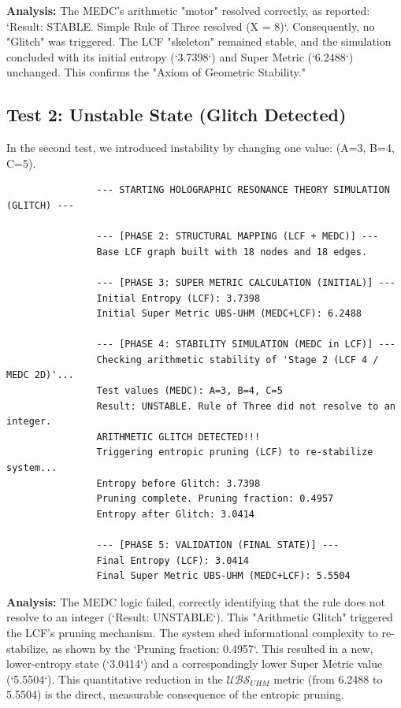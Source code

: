 \documentclass[11pt, a4paper]{article}
\begin{document}
		\textbf{Analysis:} The MEDC's arithmetic "motor" resolved correctly, as reported: `Result: STABLE. Simple Rule of Three resolved (X = 8)`. Consequently, no "Glitch" was triggered. The LCF "skeleton" remained stable, and the simulation concluded with its initial entropy (`3.7398`) and Super Metric (`6.2488`) unchanged. This confirms the "Axiom of Geometric Stability."
		
		\subsection{Test 2: Unstable State (Glitch Detected)}
		In the second test, we introduced instability by changing one value: (A=3, B=4, C=5).
		
		\begin{minipage}{\textwidth}
			\begin{verbatim}
				--- STARTING HOLOGRAPHIC RESONANCE THEORY SIMULATION (GLITCH) ---
				
				--- [PHASE 2: STRUCTURAL MAPPING (LCF + MEDC)] ---
				Base LCF graph built with 18 nodes and 18 edges.
				
				--- [PHASE 3: SUPER METRIC CALCULATION (INITIAL)] ---
				Initial Entropy (LCF): 3.7398
				Initial Super Metric UBS-UHM (MEDC+LCF): 6.2488
				
				--- [PHASE 4: STABILITY SIMULATION (MEDC in LCF)] ---
				Checking arithmetic stability of 'Stage 2 (LCF 4 / MEDC 2D)'...
				Test values (MEDC): A=3, B=4, C=5
				Result: UNSTABLE. Rule of Three did not resolve to an integer.
				ARITHMETIC GLITCH DETECTED!!!
				Triggering entropic pruning (LCF) to re-stabilize system...
				Entropy before Glitch: 3.7398
				Pruning complete. Pruning fraction: 0.4957
				Entropy after Glitch: 3.0414
				
				--- [PHASE 5: VALIDATION (FINAL STATE)] ---
				Final Entropy (LCF): 3.0414
				Final Super Metric UBS-UHM (MEDC+LCF): 5.5504
			\end{verbatim}
		\end{minipage}
		
		\textbf{Analysis:} The MEDC logic failed, correctly identifying that the rule does not resolve to an integer (`Result: UNSTABLE`). This "Arithmetic Glitch" triggered the LCF's pruning mechanism. The system shed informational complexity to re-stabilize, as shown by the `Pruning fraction: 0.4957`. This resulted in a new, lower-entropy state (`3.0414`) and a correspondingly lower Super Metric value (`5.5504`). This quantitative reduction in the $\mathcal{UBS}_{UHM}$ metric (from 6.2488 to 5.5504) is the direct, measurable consequence of the entropic pruning.
		
\end{document}
